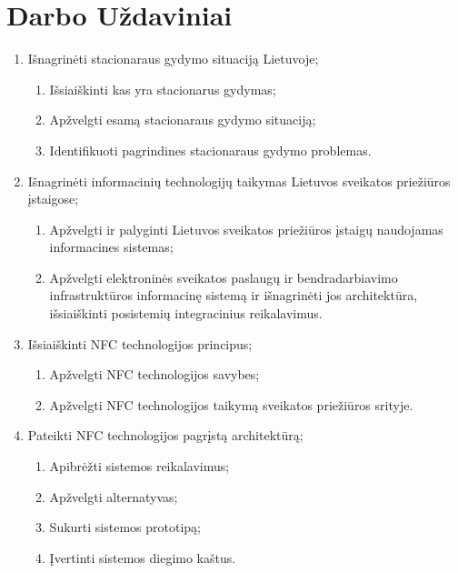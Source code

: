\documentclass{VUMIFPSbakalaurinis}
\begin{document}
\section{Darbo Uždaviniai}
    \begin{enumerate}
        \item Išnagrinėti stacionaraus gydymo situaciją Lietuvoje;
        \begin{enumerate}
            \item Išsiaiškinti kas yra stacionarus gydymas;
            \item Apžvelgti esamą stacionaraus gydymo situaciją;
            \item Identifikuoti pagrindines stacionaraus gydymo problemas.
        \end{enumerate}
        \item Išnagrinėti informacinių technologijų taikymas Lietuvos sveikatos priežiūros įstaigose;
        \begin{enumerate}
            \item Apžvelgti ir palyginti Lietuvos sveikatos priežiūros įstaigų naudojamas informacines sistemas;
            \item Apžvelgti elektroninės sveikatos paslaugų ir bendradarbiavimo infrastruktūros informacinę sistemą ir išnagrinėti jos architektūra, išsiaiškinti posistemių integracinius reikalavimus.
        \end{enumerate}
        \item Išsiaiškinti NFC technologijos principus;
        \begin{enumerate}
            \item Apžvelgti NFC technologijos savybes;
            \item Apžvelgti NFC technologijos taikymą sveikatos priežiūros srityje.
        \end{enumerate}
        \item Pateikti NFC technologijos pagrįstą architektūrą;
        \begin{enumerate}
            \item Apibrėžti sistemos reikalavimus;
            \item Apžvelgti alternatyvas;
            \item Sukurti sistemos prototipą;
            \item Įvertinti sistemos diegimo kaštus.
        \end{enumerate}
    \end{enumerate}
\end{document}
